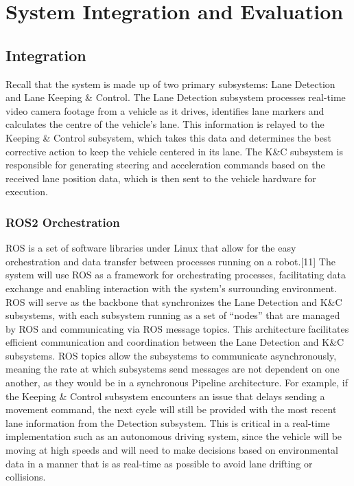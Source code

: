 \documentclass[titlepage]{article}
\begin{document}
{\section{System Integration and Evaluation}

\subsection{Integration}
Recall that the system is made up of two primary subsystems: Lane Detection and Lane Keeping \& Control. The Lane Detection subsystem processes real-time video camera footage from a vehicle as it drives, identifies lane markers and calculates the centre of the vehicle’s lane. This information is relayed to the Keeping \& Control subsystem, which takes this data and determines the best corrective action to keep the vehicle centered in its lane. The K\&C subsystem is responsible for generating steering and acceleration commands based on the received lane position data, which is then sent to the vehicle hardware for execution.


\subsubsection{ROS2 Orchestration}
ROS is a set of software libraries under Linux that allow for the easy orchestration and data transfer between processes running on a robot.[11] The system will use ROS as a framework for orchestrating processes, facilitating data exchange and enabling interaction with the system’s surrounding environment. ROS will serve as the backbone that synchronizes the Lane Detection and K\&C subsystems, with each subsystem running as a set of “nodes” that are managed by ROS and communicating via ROS message topics. This architecture facilitates efficient communication and coordination between the Lane Detection and K\&C subsystems. ROS topics allow the subsystems to communicate asynchronously, meaning the rate at which subsystems send messages are not dependent on one another, as they would be in a synchronous Pipeline architecture. For example, if the Keeping \& Control subsystem encounters an issue that delays sending a movement command, the next cycle will still be provided with the most recent lane information from the Detection subsystem. This is critical in a real-time implementation such as an autonomous driving system, since the vehicle will be moving at high speeds and will need to make decisions based on environmental data in a manner that is as real-time as possible to avoid lane drifting or collisions.

}
\end{document}
